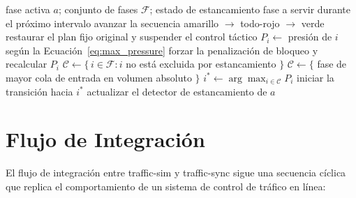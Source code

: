 \begin{algorithm}[htbp]
\caption{Ciclo de decisión de Max-Pressure, ejecutado cada 5~s en cada intersección semaforizada.}
\label{alg:mp_ciclo}
\begin{algorithmic}[1]
\Require fase activa $a$; conjunto de fases $\mathcal{F}$; estado de estancamiento
\Ensure fase a servir durante el próximo intervalo
    \State avanzar la secuencia amarillo $\to$ todo-rojo $\to$ verde
    \State \Return
\EndIf
{}
    \State restaurar el plan fijo original y suspender el control táctico
    \State \Return
\EndIf
{}
    \State \Return {}
\EndIf
{}
    \State $P_i \gets$ presión de $i$ según la Ecuación~\eqref{eq:max_pressure}
        \State forzar la penalización de bloqueo y recalcular $P_i$ 
    \EndIf
\EndFor
\State $\mathcal{C} \gets \{\, i \in \mathcal{F} : i$ no está excluida por estancamiento $\}$
    \State $\mathcal{C} \gets \{$ fase de mayor cola de entrada en volumen absoluto $\}$ 
\EndIf
\State $i^{*} \gets \arg\max_{i \in \mathcal{C}} P_i$
    \State iniciar la transición hacia $i^{*}$
    \State actualizar el detector de estancamiento de $a$
\EndIf
\end{algorithmic}
\end{algorithm}

\section{Flujo de Integración}
\label{subsec:traffic_sim_integration}

El flujo de integración entre traffic-sim y traffic-sync sigue una secuencia cíclica que replica el comportamiento de un sistema de control de tráfico en línea:

